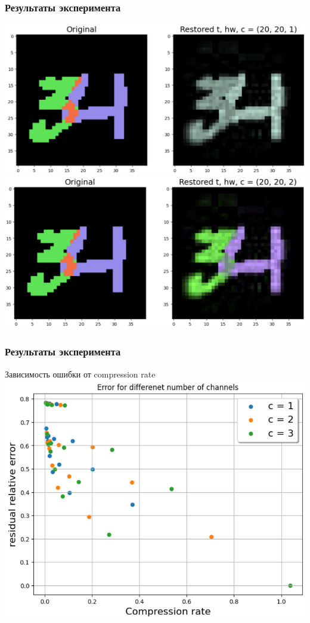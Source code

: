 \documentclass[10pt]{beamer}
\begin{document}
\begin{frame}
	\frametitle{Результаты эксперимента}
	\centering
	\includegraphics[scale=0.35]{./res20_20_1.png}
	\includegraphics[scale=0.35]{./res20_20_2.png}
\end{frame}


\begin{frame}
	\frametitle{Результаты эксперимента}
	\begin{block}{Зависимость ошибки от compression rate}
		\centering
		\includegraphics[scale=0.45]{./channels.png}
	\end{block}		
\end{frame}
\end{document}
